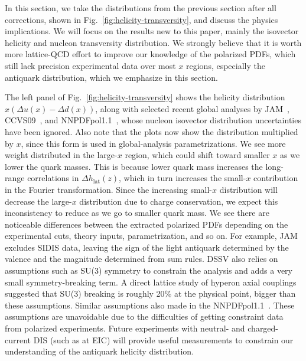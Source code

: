 
In this section, we take the distributions from the previous section after all corrections, shown in Fig.~\ref{fig:helicity-transversity}, and discuss
the physics implications. We will focus on the results new to this paper, mainly the
isovector helicity and nucleon transversity distribution. 
We strongly believe that it is worth more lattice-QCD effort to improve our knowledge of the polarized
PDFs, which still lack precision experimental data over most $x$ regions, especially
the antiquark distribution, which we emphasize in this section. 

The left panel of Fig.~\ref{fig:helicity-transversity} shows the helicity distribution
$x (\Delta u(x)-\Delta d(x))$, along with selected recent global analyses
by JAM~\cite{Jimenez-Delgado:2013boa}, CCVS09~\cite{deFlorian:2009vb}, and
NNPDFpol1.1~\cite{Nocera:2014gqa}, whose nucleon isovector distribution uncertainties have been ignored.
Also note that the plots now show the distribution multiplied by $x$,
since this form is used in global-analysis parametrizations.
We see more weight distributed in the large-$x$ region, which could shift toward smaller $x$ as we lower 
the quark masses. This is because lower quark mass increases the long-range correlations in ${\Delta h}_\text{lat}(z)$,
which in turn increases the small-$x$ contribution in the Fourier transformation. 
Since the increasing small-$x$ distribution will decrease the large-$x$ distribution due to charge conservation,
we expect this inconsistency to reduce as we go to smaller quark mass. 
%
We see there are noticeable differences between the extracted polarized PDFs
depending on the experimental cuts, theory inputs, parametrization, and so on.
For example, JAM excludes SIDIS data, leaving the sign of the light antiquark
determined by the valence and the magnitude determined from sum rules. 
DSSV also relies on assumptions such as SU(3) symmetry to constrain the 
analysis and adds a very small symmetry-breaking term. A direct lattice study
of hyperon axial couplings~\cite{Lin:2007ap} suggested that SU(3) breaking is
roughly 20\% at the physical point, bigger than these assumptions. 
Similar assumptions also made in the NNPDFpol1.1~\cite{Nocera:2014gqa}.
These assumptions are unavoidable due to the difficulties of getting constraint data from polarized experiments.
%
Future experiments with neutral- and
charged-current DIS (such as at EIC) will provide useful measurements
to constrain our understanding of the antiquark helicity distribution.

